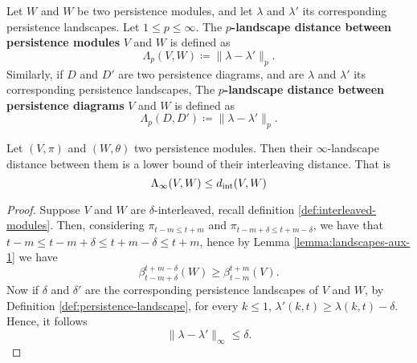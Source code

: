 \begin{definition}
    Let $ W $ and $ W $ be two persistence modules, and let $ \lambda $ and $ \lambda' $ its corresponding persistence landscapes. Let $ 1 \leq p \leq \infty $. The {\bf $p$-landscape distance between persistence modules} $ V $ and $ W $ is defined as
    \begin{equation}
        \Lambda_p(V, W) \coloneq \|\lambda - \lambda' \|_p.
    \end{equation}
    Similarly, if $ D $ and $ D' $ are two persistence diagrams, and are $ \lambda $ and $ \lambda' $ its corresponding persistence landscapes, The {\bf $p$-landscape distance between persistence diagrams} $ V $ and $ W $ is defined as
    \begin{equation}
        \Lambda_p(D, D') \coloneq \|\lambda - \lambda' \|_p.
    \end{equation}
\end{definition}

\begin{theorem} \label{theorem:landscapes-aux}
    Let $ (V, \pi) $ and $ (W, \theta) $ two persistence modules. Then their $\infty$-landscape distance between them is a lower bound of their interleaving distance. That is
    \begin{equation}
        \Lambda_{\infty}(V, W) \leq d_{\operatorname{int}}(V, W)
    \end{equation}
\end{theorem}
\begin{proof}
    Suppose $ V $ and $ W $ are $\delta$-interleaved, recall definition \ref{def:interleaved-modules}. Then, considering $ \pi_{t-m \leq t+m} $ and $ \pi_{t-m + \delta \leq t+m - \delta } $, we have that $ t-m \leq t-m + \delta \leq t+m - \delta \leq t+m $, hence by Lemma \ref{lemma:landscapes-aux-1} we have
    \begin{equation}
        \beta_{t-m+\delta}^{t+m-\delta}(W) \geq \beta_{t-m}^{t+m}(V).
    \end{equation}
    Now if $ \delta $ and $ \delta' $ are the corresponding persistence landscapes of $ V $ and $ W $, by Definition \ref{def:persistence-landscape}, for every $ k \leq 1 $, $ \lambda'(k, t) \geq \lambda(k, t) - \delta $. Hence, it follows
    \begin{equation}
        \|\lambda - \lambda'\|_\infty \leq \delta.
    \end{equation}
\end{proof}

